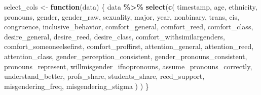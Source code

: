 \documentclass[12pt,twoside]{reedthesis}
\newenvironment{Shaded}{\begin{snugshade}}{\end{snugshade}}
\newcommand{\ControlFlowTok}[1]{\textcolor[rgb]{0.13,0.29,0.53}{\textbf{#1}}}
\newcommand{\KeywordTok}[1]{\textcolor[rgb]{0.13,0.29,0.53}{\textbf{#1}}}
\newcommand{\NormalTok}[1]{#1}
\newcommand{\OperatorTok}[1]{\textcolor[rgb]{0.81,0.36,0.00}{\textbf{#1}}}
\newcommand{\StringTok}[1]{\textcolor[rgb]{0.31,0.60,0.02}{#1}}
\begin{document}
\begin{Shaded}
\begin{Highlighting}[]
\NormalTok{select\_cols \textless{}{-}}\StringTok{ }\ControlFlowTok{function}\NormalTok{(data) \{}
\NormalTok{  data }\OperatorTok{\%\textgreater{}\%}
\StringTok{    }\KeywordTok{select}\NormalTok{(}\KeywordTok{c}\NormalTok{(}
\NormalTok{      timestamp,}
\NormalTok{      age,}
\NormalTok{      ethnicity,}
\NormalTok{      pronouns,}
\NormalTok{      gender,}
\NormalTok{      gender\_raw,}
\NormalTok{      sexuality,}
\NormalTok{      major,}
\NormalTok{      year,}
\NormalTok{      nonbinary,}
\NormalTok{      trans,}
\NormalTok{      cis,}
\NormalTok{      congruence,}
\NormalTok{      inclusive\_behavior,}
\NormalTok{      comfort\_general,}
\NormalTok{      comfort\_reed,}
\NormalTok{      comfort\_class,}
\NormalTok{      desire\_general,}
\NormalTok{      desire\_reed,}
\NormalTok{      desire\_class,}
\NormalTok{      comfort\_withsimilargenders,}
\NormalTok{      comfort\_someoneelsefirst,}
\NormalTok{      comfort\_proffirst,}
\NormalTok{      attention\_general,}
\NormalTok{      attention\_reed,}
\NormalTok{      attention\_class,}
\NormalTok{      gender\_perception\_consistent,}
\NormalTok{      gender\_pronouns\_consistent,}
\NormalTok{      pronouns\_represent,}
\NormalTok{      willmisgender\_ifnopronouns,}
\NormalTok{      assume\_pronouns\_correctly,}
\NormalTok{      understand\_better,}
\NormalTok{      profs\_share,}
\NormalTok{      students\_share,}
\NormalTok{      reed\_support,}
\NormalTok{      misgendering\_freq,}
\NormalTok{      misgendering\_stigma}
\NormalTok{      )}
\NormalTok{    )}
\NormalTok{\}}


\end{Highlighting}
\end{Shaded}
\end{document}
